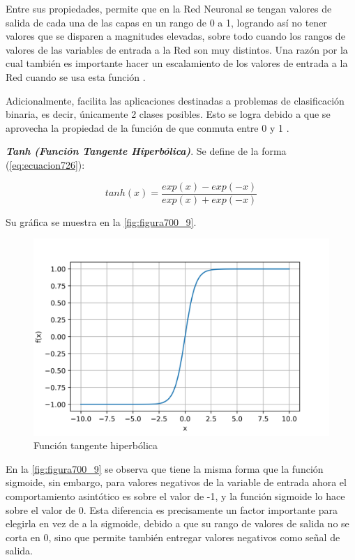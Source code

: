 {Entre sus propiedades, permite que en la Red Neuronal se tengan valores de salida de cada una de las capas en un rango de 0 a 1, logrando así no tener valores que se disparen a magnitudes elevadas, sobre todo cuando los 
rangos de valores de las variables de entrada a la Red son muy distintos. Una razón por la cual también es importante hacer un escalamiento de los valores de entrada a la Red cuando se usa esta función \cite{RNAlineasDeTransmisión}. 

Adicionalmente, facilita las aplicaciones destinadas a problemas de clasificación binaria, es decir, únicamente 2 clases posibles. Esto se logra debido a que se aprovecha la propiedad de la función de que conmuta entre 0 
y 1 \cite{RNAlineasDeTransmisión}. 

\textbf{\textit{Tanh (Función Tangente Hiperbólica)}}. Se define de la forma (\ref{eq:ecuacion726}):

\begin{equation}
	tanh(x)=\frac{exp(x) - exp(-x)}{exp(x) + exp(-x)}
	\label{eq:ecuacion726}
\end{equation}

Su gráfica se muestra en la \autoref{fig:figura700_9}.

\begin{figure}[h]
	\centering
	\includegraphics[scale=0.8]{imgss150.png}
	\caption{Función tangente hiperbólica}
	\label{fig:figura700_9}
\end{figure}

En la \autoref{fig:figura700_9} se observa que tiene la misma forma que la función sigmoide, sin embargo, para valores negativos de la variable de entrada ahora el comportamiento asintótico es sobre el valor de -1, y la 
función sigmoide lo hace sobre el valor de 0. Esta diferencia es precisamente un factor importante para elegirla en vez de a la sigmoide, debido a que su rango de valores de salida no se corta en 0, sino que permite también 
entregar valores negativos como señal de salida. 

}
